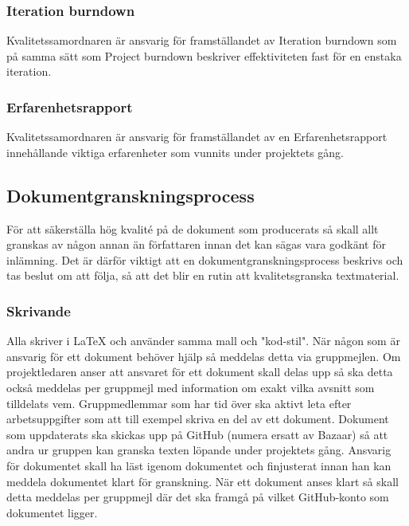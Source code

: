 \subsubsection{Iteration burndown}
Kvalitetssamordnaren är ansvarig för framställandet av Iteration burndown som på samma sätt som Project burndown beskriver effektiviteten fast för en enstaka iteration.

\subsubsection{Erfarenhetsrapport}
Kvalitetssamordnaren är ansvarig för framställandet av en Erfarenhetsrapport innehållande viktiga erfarenheter som vunnits under projektets gång.

\subsection{Dokumentgranskningsprocess}
För att säkerställa hög kvalité på de dokument som producerats så skall allt granskas av någon annan än författaren innan det kan sägas vara godkänt för inlämning. Det är därför viktigt att en dokumentgranskningsprocess beskrivs och tas beslut om att följa, så att det blir en rutin att kvalitetsgranska textmaterial.

\subsubsection{Skrivande}
Alla skriver i LaTeX och använder samma mall och "kod-stil". När någon som är ansvarig för ett dokument behöver hjälp så meddelas detta via gruppmejlen. Om projektledaren anser att ansvaret för ett dokument skall delas upp så ska detta också meddelas per gruppmejl med information om exakt vilka avsnitt som tilldelats vem. Gruppmedlemmar som har tid över ska aktivt leta efter arbetsuppgifter som att till exempel skriva en del av ett dokument. Dokument som uppdaterats ska skickas upp på GitHub (numera ersatt av Bazaar) så att andra ur gruppen kan granska texten löpande under projektets gång. Ansvarig för dokumentet skall ha läst igenom dokumentet och finjusterat innan han kan meddela dokumentet klart för granskning. När ett dokument anses klart så skall detta meddelas per gruppmejl där det ska framgå på vilket GitHub-konto som dokumentet ligger.


